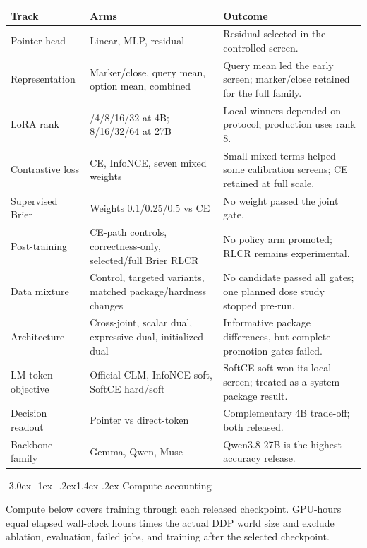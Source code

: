 \documentclass[10pt]{article}
\makeatletter
\renewcommand\section{\@startsection{section}{1}{\z@}%
  {-3.0ex \@plus -1ex \@minus -.2ex}{1.4ex \@plus .2ex}%
  {\color{navy}\Large\bfseries}}
\makeatother
\begin{document}
\begin{tabular}{>{\raggedright\arraybackslash}p{.20\linewidth}>{\raggedright\arraybackslash}p{.27\linewidth}>{\raggedright\arraybackslash}p{.43\linewidth}}
\toprule
Track & Arms & Outcome \\
\midrule
Pointer head & Linear, MLP, residual & Residual selected in the controlled screen. \\
Representation & Marker/close, query mean, option mean, combined & Query mean led the early screen; marker/close retained for the full family. \\
LoRA rank & 2/4/8/16/32 at 4B; 8/16/32/64 at 27B & Local winners depended on protocol; production uses rank 8. \\
Contrastive loss & CE, InfoNCE, seven mixed weights & Small mixed terms helped some calibration screens; CE retained at full scale. \\
Supervised Brier & Weights 0.1/0.25/0.5 vs CE & No weight passed the joint gate. \\
Post-training & CE-path controls, correctness-only, selected/full Brier RLCR & No policy arm promoted; RLCR remains experimental. \\
Data mixture & Control, targeted variants, matched package/hardness changes & No candidate passed all gates; one planned dose study stopped pre-run. \\
Architecture & Cross-joint, scalar dual, expressive dual, initialized dual & Informative package differences, but complete promotion gates failed. \\
LM-token objective & Official CLM, InfoNCE-soft, SoftCE hard/soft & SoftCE-soft won its local screen; treated as a system-package result. \\
Decision readout & Pointer vs direct-token & Complementary 4B trade-off; both released. \\
Backbone family & Gemma, Qwen, Muse & Qwen3.8 27B is the highest-accuracy release. \\
\bottomrule
\end{tabular}

\section{Compute accounting}

Compute below covers training through each released checkpoint. GPU-hours equal
elapsed wall-clock hours times the actual DDP world size and exclude ablation,
evaluation, failed jobs, and training after the selected checkpoint.
\end{document}
